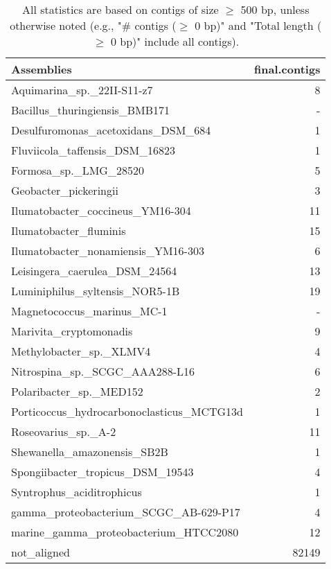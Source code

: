 \documentclass[12pt,a4paper]{article}
\begin{document}
\begin{table}[ht]
\begin{center}
\caption{All statistics are based on contigs of size $\geq$ 500 bp, unless otherwise noted (e.g., "\# contigs ($\geq$ 0 bp)" and "Total length ($\geq$ 0 bp)" include all contigs).}
\begin{tabular}{|l*{1}{|r}|}
\hline
Assemblies & final.contigs \\ \hline
Aquimarina\_sp.\_22II-S11-z7 & 8 \\ \hline
Bacillus\_thuringiensis\_BMB171 & - \\ \hline
Desulfuromonas\_acetoxidans\_DSM\_684 & 1 \\ \hline
Fluviicola\_taffensis\_DSM\_16823 & 1 \\ \hline
Formosa\_sp.\_LMG\_28520 & 5 \\ \hline
Geobacter\_pickeringii & 3 \\ \hline
Ilumatobacter\_coccineus\_YM16-304 & 11 \\ \hline
Ilumatobacter\_fluminis & 15 \\ \hline
Ilumatobacter\_nonamiensis\_YM16-303 & 6 \\ \hline
Leisingera\_caerulea\_DSM\_24564 & 13 \\ \hline
Luminiphilus\_syltensis\_NOR5-1B & 19 \\ \hline
Magnetococcus\_marinus\_MC-1 & - \\ \hline
Marivita\_cryptomonadis & 9 \\ \hline
Methylobacter\_sp.\_XLMV4 & 4 \\ \hline
Nitrospina\_sp.\_SCGC\_AAA288-L16 & 6 \\ \hline
Polaribacter\_sp.\_MED152 & 2 \\ \hline
Porticoccus\_hydrocarbonoclasticus\_MCTG13d & 1 \\ \hline
Roseovarius\_sp.\_A-2 & 11 \\ \hline
Shewanella\_amazonensis\_SB2B & 1 \\ \hline
Spongiibacter\_tropicus\_DSM\_19543 & 4 \\ \hline
Syntrophus\_aciditrophicus & 1 \\ \hline
gamma\_proteobacterium\_SCGC\_AB-629-P17 & 4 \\ \hline
marine\_gamma\_proteobacterium\_HTCC2080 & 12 \\ \hline
not\_aligned & 82149 \\ \hline
\end{tabular}
\end{center}
\end{table}
\end{document}
